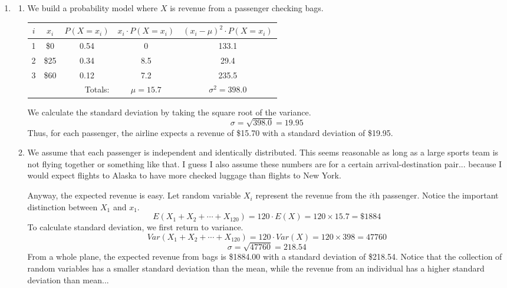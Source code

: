\documentclass[12pt,letterpaper]{article}
\begin{document}
\begin{enumerate}
\item \begin{enumerate}
\item  We build a probability model where $X$ is revenue from a passenger checking bags.
\begin{center}
\renewcommand{\arraystretch}{1.3}
\begin{tabular}{|c|c|c|c|c|} \hline
$i$ & $x_i$ & $P(X=x_i)$ & $x_i \cdot P(X=x_i)$ & $(x_i-\mu)^2 \cdot P(X=x_i)$\\ \hline
1 & \$0 & 0.54 & 0 & 133.1 \\
2 & \$25 & 0.34 & 8.5 & 29.4 \\
3 & \$60 & 0.12 & 7.2 & 235.5\\ \hline
\multicolumn{3}{r|}{Totals:} & $\mu=15.7$ & $\sigma^2=398.0$ \\\cline{4-5}
\end{tabular}
\end{center}
We calculate the standard deviation by taking the square root of the variance.
$$\sigma = \sqrt{398.0} = 19.95 $$
Thus, for each passenger, the airline expects a revenue of \$15.70 with a standard deviation of \$19.95.
\item We assume that each passenger is independent and identically distributed. This seems reasonable as long as a large sports team is not flying together or something like that. I guess I also assume these numbers are for a certain arrival-destination pair... because I would expect flights to Alaska to have more checked luggage than flights to New York.

Anyway, the expected revenue is easy. Let random variable $X_i$ represent the revenue from the $i$th passenger. Notice the important distinction between $X_1$ and $x_1$.
$$E(X_1+X_2+\cdots +X_{120}) = 120 \cdot E(X) = 120\times 15.7 = \$1884 $$
To calculate standard deviation, we first return to variance.
$$Var(X_1+X_2+\cdots +X_{120}) = 120 \cdot Var(X) = 120 \times 398 = 47760 $$
$$\sigma = \sqrt{47760} = 218.54 $$
From a whole plane, the expected revenue from bags is \$1884.00 with a standard deviation of \$218.54. Notice that the collection of random variables has a smaller standard deviation than the mean, while the revenue from an individual has a higher standard deviation than mean...
\end{enumerate}


\end{enumerate}
\end{document}
